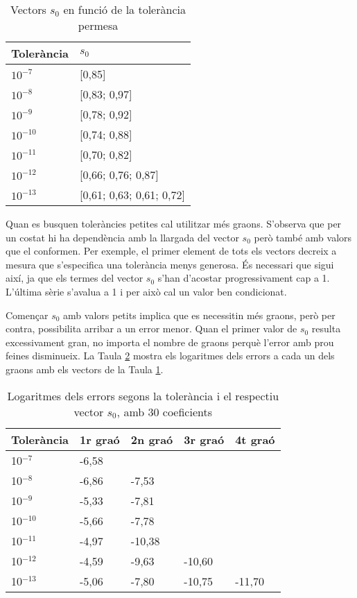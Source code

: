 \begin{table}[!htb]
  \begin{center}
  \begin{tabular}{ll}
  \hline
  Tolerància & $s_0$\\
  \hline
  \hline
  $10^{-7}$ & [0,85]\\
  $10^{-8}$ & [0,83; 0,97]\\
  $10^{-9}$ & [0,78; 0,92]\\
  $10^{-10}$ & [0,74; 0,88]\\
  $10^{-11}$ & [0,70; 0,82]\\
  $10^{-12}$ & [0,66; 0,76; 0,87]\\
  $10^{-13}$ & [0,61; 0,63; 0,61; 0,72]\\
  \hline 
  \end{tabular}
  \caption{Vectors $s_0$ en funció de la tolerància permesa}
  \label{tab:CAR7}
  \end{center}
\end{table}

Quan es busquen toleràncies petites cal utilitzar més graons. S'observa que per un costat hi ha dependència amb la llargada del vector $s_0$ però també amb valors que el conformen. Per exemple, el primer element de tots els vectors decreix a mesura que s'especifica una tolerància menys generosa. És necessari que sigui així, ja que els termes del vector $s_0$ s'han d'acostar progressivament cap a 1. L'última sèrie s'avalua a 1 i per això cal un valor ben condicionat. 

Començar $s_0$ amb valors petits implica que es necessitin més graons, però per contra, possibilita arribar a un error menor. Quan el primer valor de $s_0$ resulta excessivament gran, no importa el nombre de graons perquè l'error amb prou feines disminueix. La Taula \ref{tab:CAR8} mostra els logaritmes dels errors a cada un dels graons amb els vectors de la Taula \ref{tab:CAR7}.

\begin{table}[!htb]
  \begin{center}
  \begin{tabular}{lllll}
  \hline
  Tolerància & 1r graó & 2n graó & 3r graó & 4t graó\\
  \hline
  \hline
  10$^{-7}$     & -6,58 &       &       &  \\
  10$^{-8}$     & -6,86 & -7,53 &       &  \\
  10$^{-9}$      & -5,33 & -7,81 &       &  \\
  10$^{-10}$    & -5,66 & -7,78 &       &  \\
  10$^{-11}$     & -4,97 & -10,38 &       &  \\
  10$^{-12}$     & -4,59 & -9,63 & -10,60 &  \\
  10$^{-13}$    & -5,06 & -7,80 & -10,75 & -11,70 \\
  \hline 
  \end{tabular}
  \caption{Logaritmes dels errors segons la tolerància i el respectiu vector $s_0$, amb 30 coeficients}
  \label{tab:CAR8}
  \end{center}
\end{table}

